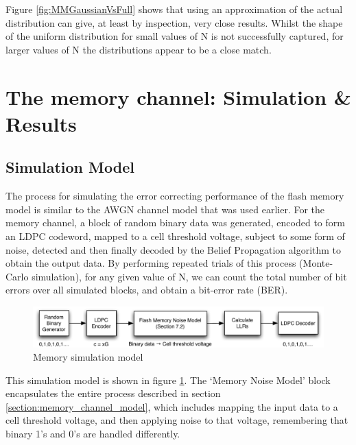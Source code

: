 \documentclass[11pt]{article}
\numberwithin{equation}{subsection}
\begin{document}
Figure \ref{fig:MMGaussianVsFull} shows that using an approximation of the actual distribution can give, at least by inspection, very close results. Whilst the shape of the uniform distribution for small values of N is not successfully captured, for larger values of N the distributions appear to be a close match. 

\section{The memory channel: Simulation \& Results}
\subsection{Simulation Model}
The process for simulating the error correcting performance of the flash memory model is similar to the AWGN channel model that was used earlier. For the memory channel, a block of random binary data was generated, encoded to form an LDPC codeword, mapped to a cell threshold voltage, subject to some form of noise, detected and then finally decoded by the Belief Propagation algorithm to obtain the output data. By performing repeated trials of this process (Monte-Carlo simulation), for any given value of N, we can count the total number of bit errors over all simulated blocks, and obtain a bit-error rate (BER). 

\begin{figure}[h]
\centering
\includegraphics[scale=0.85]{memory_channel_model}
\caption{Memory simulation model}
\label{fig:mem_simulation_model}
\end{figure}

This simulation model is shown in figure \ref{fig:mem_simulation_model}. The `Memory Noise Model' block encapsulates the entire process described in section \ref{section:memory_channel_model}, which includes mapping the input data to a cell threshold voltage, and then applying noise to that voltage, remembering that binary 1's and 0's are handled differently.
\end{document}
